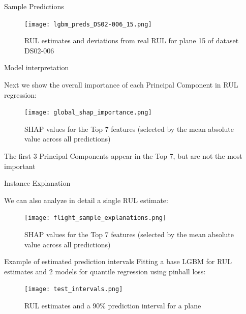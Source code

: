 \documentclass{beamer}
\begin{document}
        \begin{frame}{Sample Predictions}
            \begin{figure}
                \centering
                \texttt{[image: lgbm\_preds\_DS02-006\_15.png]}
                \caption{RUL estimates and deviations from real RUL for plane 15 of dataset DS02-006}
            \end{figure}
        \end{frame}

        \begin{frame}{Model interpretation}

            Next we show the overall importance of each Principal Component in RUL regression:
            \begin{figure}
                \centering
                \texttt{[image: global\_shap\_importance.png]}
                \caption{SHAP values for the Top 7 features (selected by the mean absolute value across all predictions)}
            \end{figure}

            The first 3 Principal Components appear in the Top 7, but are not the most important
        \end{frame}

        \begin{frame}{Instance Explanation}

            We can also analyze in detail a single RUL estimate:
            \begin{figure}
                \centering
                \texttt{[image: flight\_sample\_explanations.png]}
                \caption{SHAP values for the Top 7 features (selected by the mean absolute value across all predictions)}
            \end{figure}
        \end{frame}

        \begin{frame}{Example of estimated prediction intervals}
            Fitting a base LGBM for RUL estimates and 2 models for quantile regression using pinball loss:
            \begin{figure}
                \centering
                \texttt{[image: test\_intervals.png]}
                \caption{RUL estimates and a 90\% prediction interval for a plane}
            \end{figure}
        \end{frame}
\end{document}
